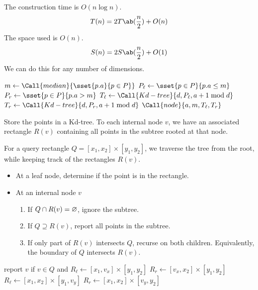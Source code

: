 The construction time is $O(n \log n)$. \[
    T(n) = 2T\ab(\frac{n}{2}) + O(n)
\] The space used is $O(n)$. \[
    S(n) = 2S\ab(\frac{n}{2}) + O(1)
\]
We can do this for any number of dimensions.
\begin{algo}
            \State \Return {}
        \EndIf
        \State $m \gets \Call{median}{\sset{p.a}{p \in P}}$
        \State $P_\ell \gets \sset{p \in P}{p.a \le m}$
        \State $P_r \gets \sset{p \in P}{p.a > m}$
        \State $T_\ell \gets \Call{Kd-tree}{d, P_\ell, a + 1 \bmod d}$
        \State $T_r \gets \Call{Kd-tree}{d, P_r, a + 1 \bmod d}$
        \State \Return $\Call{node}{a, m, T_\ell, T_r}$
    \EndFn
\end{algo}
\begin{solution} \label{sol:kd}
    Store the points in a Kd-tree.
    To each internal node $v$, we have an associated rectangle $R(v)$
    containing all points in the subtree rooted at that node.

    For a query rectangle $Q = [x_1, x_2] \times [y_1, y_2]$,
    we traverse the tree from the root, while keeping track of the
    rectangles $R(v)$.
    \begin{itemize}
        \item At a leaf node, determine if the point is in the rectangle.
        \item At an internal node $v$
        \begin{enumerate}
            \item \label{sol:kd:ignore}
                If $Q \cap R(v) = \varnothing$, ignore the subtree.
            \item \label{sol:kd:report}
                If $Q \supseteq R(v)$, report all points in the subtree.
            \item \label{sol:kd:recurse}
                If only part of $R(v)$ intersects $Q$,
                recurse on both children.
                Equivalently, the boundary of $Q$ intersects $R(v)$.
        \end{enumerate}
    \end{itemize}
    \begin{algo}
                \State report $v$ if $v \in Q$ and \Return
            \EndIf
                \State \Return
            \EndIf
                \State $R_\ell \gets [x_1, v_x] \times [y_1, y_2]$
                \State $R_r \gets [v_x, x_2] \times [y_1, y_2]$
            \Else
                \State $R_\ell \gets [x_1, x_2] \times [y_1, v_y]$
                \State $R_r \gets [x_1, x_2] \times [v_y, y_2]$
            \EndIf
            \State {}
            \State {}
        \EndFn
    \end{algo}
\end{solution}

